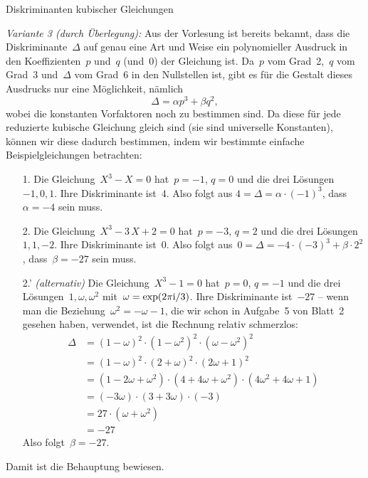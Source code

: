 \documentclass{algblatt}
\begin{document}
\begin{aufgabe}{Diskriminanten kubischer Gleichungen}
\begin{loesungE}
\emph{Variante 3 (durch Überlegung):} Aus der Vorlesung ist bereits bekannt,
dass die Diskriminante~$\Delta$ auf genau eine Art und Weise ein polynomieller
Ausdruck in den Koeffizienten~$p$ und~$q$ (und~$0$) der Gleichung ist. Da~$p$
vom Grad~2,~$q$ vom Grad~3 und~$\Delta$ vom Grad~6 in den Nullstellen ist, gibt
es für die Gestalt dieses Ausdrucks nur eine Möglichkeit, nämlich
\[ \Delta = \alpha p^3 + \beta q^2, \]
wobei die konstanten Vorfaktoren noch zu bestimmen sind. Da diese für jede
reduzierte kubische Gleichung gleich sind (sie sind universelle Konstanten),
können wir diese dadurch bestimmen, indem wir bestimmte einfache
Beispielgleichungen betrachten:
\begin{enumerate}
\item[1.] Die Gleichung~$X^3 - X = 0$ hat~$p = -1$, $q = 0$ und die drei
Lösungen~$-1, 0, 1$. Ihre Diskriminante ist~$4$. Also folgt aus
$4 = \Delta = \alpha \cdot (-1)^3$,
dass~$\alpha = -4$ sein muss.
\item[2.] Die Gleichung~$X^3 - 3\,X + 2 = 0$ hat~$p = -3$, $q = 2$ und die drei
Lösungen~$1, 1, -2$. Ihre Diskriminante ist~$0$. Also folgt aus~$0 = \Delta =
-4 \cdot (-3)^3 + \beta \cdot 2^2$, dass~$\beta = -27$ sein muss.
\item[2.'] \emph{(alternativ)}
Die Gleichung~$X^3 - 1 = 0$ hat~$p = 0$, $q = -1$ und die drei
Lösungen~$1, \omega, \omega^2$ mit~$\omega = \exp(2\pi\mathrm{i}/3)$. Ihre
Diskriminante ist~$-27$ -- wenn man die Beziehung~$\omega^2 = -\omega - 1$, die
wir schon in Aufgabe~5 von Blatt~2 gesehen haben, verwendet, ist die Rechnung
relativ schmerzlos:
\begin{align*}
  \Delta &= (1-\omega)^2 \cdot (1-\omega^2)^2 \cdot (\omega-\omega^2)^2 \\
  &= (1-\omega)^2 \cdot (2+\omega)^2 \cdot (2\omega+1)^2 \\
  &= (1-2\omega+\omega^2) \cdot (4+4\omega+\omega^2) \cdot (4\omega^2+4\omega+1) \\
  &= (-3\omega) \cdot (3+3\omega) \cdot (-3) \\
  &= 27 \cdot (\omega+\omega^2) \\
  &= -27
\end{align*}
Also folgt~$\beta = -27$.
\end{enumerate}
Damit ist die Behauptung bewiesen.
\end{loesungE}
\end{aufgabe}
\end{document}
